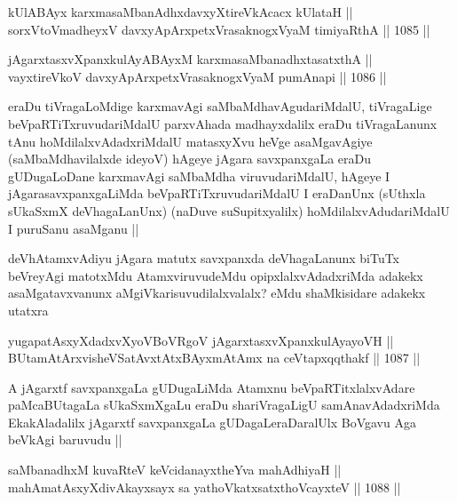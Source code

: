 
\begin{shl}
kUlABAyx karxmasaMbanAdhxdavxyXtireVkAcacx kUlataH || \\
sorxVtoVmadheyxV davxyApArxpetxVrasaknogxV\s yaM timiyaRthA ||  1085 ||  
\end{shl}
				
\begin{shl}
jAgarxtasxvXpanxkulAyABAyxM karxmasaMbanadhxtasatxthA || \\
vayxtireVkoV davxyApArxpetxVrasaknogxV\s yaM pumAnapi ||  1086 || 
\end{shl}

\begin{artha}
eraDu tiVragaLoMdige karxmavAgi saMbaMdhavAgudariMdalU, tiVragaLige beVpaRTiTxruvudariMdalU parxvAhada madhayxdalilx eraDu tiVragaLanunx tAnu hoMdilalxvAdadxriMdalU matasxyXvu heVge asaMgavAgiye (saMbaMdhavilalxde ideyoV) hAgeye jAgara savxpanxgaLa eraDu gUDugaLoDane karxmavAgi saMbaMdha viruvudariMdalU, hAgeye I jAgarasavxpanxgaLiMda beVpaRTiTxruvudariMdalU I eraDanUnx (sUthxla sUkaSxmX deVhagaLanUnx) (naDuve suSupitxyalilx) hoMdilalxvAdudariMdalU I puruSanu asaMganu ||
\end{artha}

\begin{artha}
deVhAtamxvAdiyu jAgara matutx savxpanxda deVhagaLanunx biTuTx beVreyAgi matotxMdu AtamxviruvudeMdu opipxlalxvAdadxriMda adakekx asaMgatavxvanunx aMgiVkarisuvudilalxvalalx? eMdu shaMkisidare adakekx utatxra
\end{artha}

\begin{shl}
yugapatAsxyXdadxvXyoVBoVRgoV jAgarxtasxvXpanxkulAyayoVH || \\
BUtamAtArxvisheVSatAvxtAtxBAyxmAtAmx na ceVtapxqqthakf ||  1087 ||  
\end{shl}

\begin{artha}
A jAgarxtf savxpanxgaLa gUDugaLiMda Atamxnu beVpaRTitxlalxvAdare paMcaBUtagaLa sUkaSxmXgaLu eraDu shariVragaLigU samAnavAdadxriMda EkakAladalilx jAgarxtf savxpanxgaLa gUDagaLeraDaralUlx BoVgavu Aga beVkAgi baruvudu ||
\end{artha}


\begin{shl}
saMbanadhxM kuvaRteV keVcidanayxtheYva mahAdhiyaH || \\
mahAmatAsxyXdivAkayxsayx sa yathoVkatxsatxthoVcayxteV ||  1088 ||  
\end{shl}

